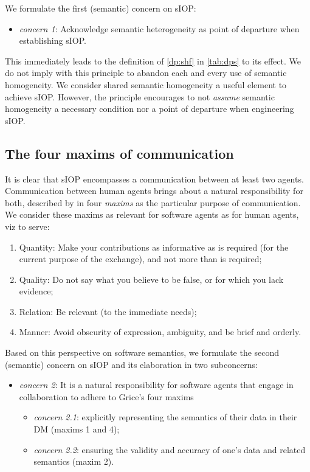 \documentclass[sort&compress,preprint,authoryear,3p,twocolumn]{elsarticle}
\providecommand{\tightlist}{%
  \setlength{\itemsep}{0pt}\setlength{\parskip}{0pt}}
\begin{document}
We formulate the first (semantic) concern on sIOP:

\begin{itemize}
\tightlist
\item
  \emph{concern 1}: Acknowledge semantic heterogeneity as point of
  departure when establishing sIOP.
\end{itemize}

This immediately leads to the definition of \cref{dp:shf} in
\cref{tab:dps} to its effect. We do not imply with this principle to
abandon each and every use of semantic homogeneity. We consider shared
semantic homogeneity a useful element to achieve sIOP. However, the
principle encourages to not \emph{assume} semantic homogeneity a
necessary condition nor a point of departure when engineering sIOP.

\hypertarget{the-four-maxims-of-communication}{%
\subsection{The four maxims of
communication}\label{the-four-maxims-of-communication}}

It is clear that sIOP encompasses a communication between at least two
agents. Communication between human agents brings about a natural
responsibility for both, described by \citep{Grice:1991BT} in four
\emph{maxims} as the particular purpose of communication. We consider
these maxims as relevant for software agents as for human agents, viz to
serve:

\begin{enumerate}
\def\labelenumi{\arabic{enumi}.}
\tightlist
\item
  Quantity: Make your contributions as informative as is required (for
  the current purpose of the exchange), and not more than is required;
\item
  Quality: Do not say what you believe to be false, or for which you
  lack evidence;
\item
  Relation: Be relevant (to the immediate needs);
\item
  Manner: Avoid obscurity of expression, ambiguity, and be brief and
  orderly.
\end{enumerate}

Based on this perspective on software semantics, we formulate the second
(semantic) concern on sIOP and its elaboration in two subconcerns:

\begin{itemize}
\tightlist
\item
  \emph{concern 2}: It is a natural responsibility for software agents
  that engage in collaboration to adhere to Grice's four maxims

  \begin{itemize}
  \tightlist
  \item
    \emph{concern 2.1}: explicitly representing the semantics of their
    data in their DM (maxims 1 and 4);
  \item
    \emph{concern 2.2}: ensuring the validity and accuracy of one's data
    and related semantics (maxim 2).
  \end{itemize}
\end{itemize}
\end{document}
